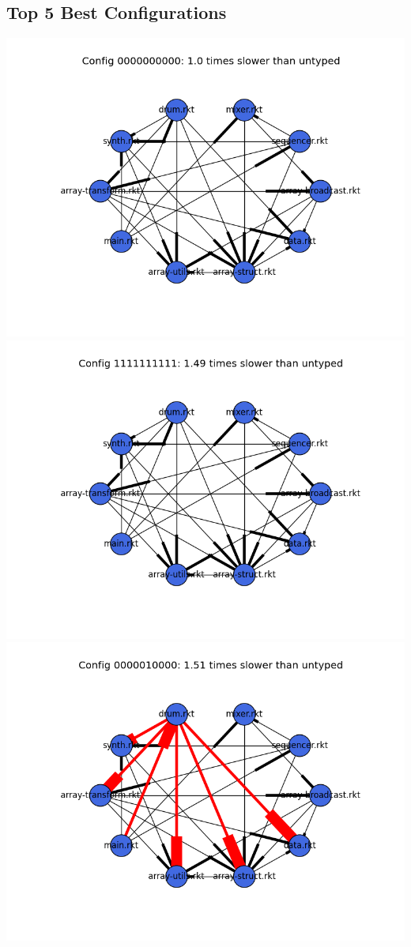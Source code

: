 \documentclass{article}
\begin{document}
\begin{itemize}
\subsection{Top 5 Best Configurations}
\includegraphics[width=\textwidth]{funkytown-module-graph-0000000000.png}
\includegraphics[width=\textwidth]{funkytown-module-graph-1111111111.png}
\includegraphics[width=\textwidth]{funkytown-module-graph-0000010000.png}

\end{itemize}
\end{document}
